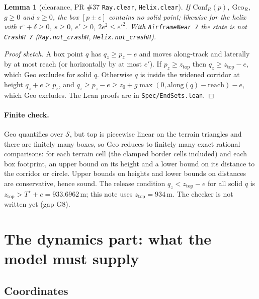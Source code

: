 \documentclass[11pt]{article}
\newtheorem{lemma}[theorem]{Lemma}
\newcommand{\Solid}{\mathcal{S}}
\newcommand{\Top}{\mathrm{top}}
\newcommand{\Conf}{\ensuremath{\mathrm{Conf}}}
\newcommand{\Geo}{\ensuremath{\mathrm{Geo}}}
\newcommand{\zTop}{z_{\mathrm{top}}}
\begin{document}
\begin{lemma}[clearance, PR \#37 \texttt{Ray.clear}, \texttt{Helix.clear}]\label{lem:clear}
If $\Conf_R(p)$, $\Geo_R$, $g \ge 0$ and $s \ge 0$, the box $[p \pm e]$ contains no solid point; likewise for the helix with $r^\circ + \delta \ge 0$, $s \ge 0$, $e' \ge 0$, $2e^2 \le e'^2$. With \texttt{AirframeNear 7} the state is not \texttt{CrashH 7} (\texttt{Ray.not\_crashH}, \texttt{Helix.not\_crashH}).
\end{lemma}
\begin{proof}[Proof sketch]
A box point $q$ has $q_z \ge p_z - e$ and moves along-track and laterally by at most $\mathrm{reach}$ (or horizontally by at most $e'$). If $p_z \ge \zTop$ then $q_z \ge \zTop - e$, which $\Geo$ excludes for solid $q$. Otherwise $q$ is inside the widened corridor at height $q_z + e \ge p_z$, and $q_z \ge p_z - e \ge z_0 + g\max(0, \mathrm{along}(q) - \mathrm{reach}) - e$, which $\Geo$ excludes. The Lean proofs are in \texttt{Spec/EndSets.lean}.
\end{proof}

\paragraph{Finite check.} $\Geo$ quantifies over $\Solid$, but $\Top$ is piecewise linear on the terrain triangles and there are finitely many boxes, so $\Geo$ reduces to finitely many exact rational comparisons: for each terrain cell (the clamped border cells included) and each box footprint, an upper bound on its height and a lower bound on its distance to the corridor or circle. Upper bounds on heights and lower bounds on distances are conservative, hence sound. The release condition $q_z < \zTop - e$ for all solid $q$ is $\zTop > T^\star + e = 933.6962$\,m; this note uses $\zTop = 934$\,m. The checker is not written yet (gap G8).

\section{The dynamics part: what the model must supply}\label{sec:dyn}

\subsection{Coordinates}
\end{document}
